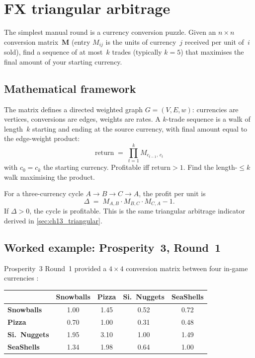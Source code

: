 \section{FX triangular arbitrage}
\label{sec:ch25_fx_arb}

The simplest manual round is a currency conversion puzzle.  Given
an $n \times n$ conversion matrix~$\mathbf{M}$ (entry $M_{ij}$ is
the units of currency~$j$ received per unit of~$i$ sold), find a
sequence of at most~$k$ trades (typically $k = 5$) that maximises
the final amount of your starting currency.

\subsection{Mathematical framework}

The matrix defines a directed weighted graph $G = (V, E, w)$:
currencies are vertices, conversions are edges, weights are rates.
A $k$-trade sequence is a walk of length~$k$ starting and ending
at the source currency, with final amount equal to the edge-weight
product:
\begin{equation}
  \text{return}
  \;=\;
  \prod_{t=1}^{k} M_{c_{t-1},\, c_t}
  \label{eq:ch25_fx_return}
\end{equation}
with $c_0 = c_k$ the starting currency.  Profitable iff
$\text{return} > 1$.  Find the length-$\le k$ walk maximising
the product.

\begin{keyfactbox}
For a three-currency cycle $A \to B \to C \to A$, the profit
per unit is
\[
  \Delta \;=\;
  M_{A,B} \cdot M_{B,C} \cdot M_{C,A} - 1.
\]
If $\Delta > 0$, the cycle is profitable.  This is the same
triangular arbitrage indicator derived in
\cref{sec:ch13_triangular}.
\end{keyfactbox}

\subsection{Worked example: Prosperity~3, Round~1}

Prosperity~3 Round~1 provided a $4 \times 4$ conversion matrix
between four in-game currencies \citep{frankfurtHedgehogs2025imcP3}:

\medskip
\begin{center}
\begin{tabular}{l c c c c}
\toprule
 & \textbf{Snowballs} & \textbf{Pizza} & \textbf{Si.\ Nuggets} & \textbf{SeaShells} \\
\midrule
\textbf{Snowballs}      & 1.00 & 1.45 & 0.52 & 0.72 \\
\textbf{Pizza}           & 0.70 & 1.00 & 0.31 & 0.48 \\
\textbf{Si.\ Nuggets}    & 1.95 & 3.10 & 1.00 & 1.49 \\
\textbf{SeaShells}       & 1.34 & 1.98 & 0.64 & 1.00 \\
\bottomrule
\end{tabular}
\end{center}
\medskip

